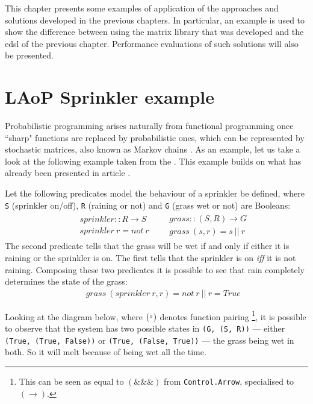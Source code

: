 \documentclass[
  oneside,
  11pt, a4paper,
  footinclude=true,
  headinclude=true,
  cleardoublepage=empty
]{scrbook}
\theoremstyle{definition}
\theoremstyle{definition}
\def\start{&&}
\def\more{\\&&}
\def\kr{\mathbin{\hbox{\tiny${}^\triangledown$}}}
\begin{document}
    This chapter presents some examples of application of the approaches and solutions developed in the previous chapters. In particular, an example is used to show the difference between using the matrix library that was developed and the \gls{edsl} of the previous chapter. Performance evaluations of such solutions will also be presented.
    
        \section{LAoP Sprinkler example}
        
        Probabilistic programming arises naturally from functional programming once ``sharp" functions are replaced by probabilistic ones, which can be represented by stochastic matrices, also known as Markov chains \citep{oliveira2012towards}. As an example, let us take a look at the following example taken from the \citet{wiki:BayesianNetwork}. This example builds on what has already been presented in article \cite{Armando2020}. 
        
        Let the following predicates model the behaviour of a sprinkler be defined, where \texttt{S} (sprinkler on/off), \texttt{R} (raining or not) and \texttt{G} (grass wet or not) are Booleans:
        \begin{eqnarray*}
        \begin{array}{rcl}
        \start sprinkler :: R \to S
        \more sprinkler\ r = not\ r
        \end{array}
        \begin{array}{rcl}
        \start grass :: (S, R) \to G
        \more grass\ (s,r) = s\ ||\ r
        \end{array}
        \end{eqnarray*}
        The second predicate tells that the grass will be wet if and only if either it is raining or the sprinkler is on. The first tells that the sprinkler is on \emph{iff} it is not raining. Composing these two predicates it is possible to see that rain completely determines the state of the grass:
        \begin{eqnarray*}
        \start grass\ (sprinkler\ r,r) = not\ r\ ||\ r = True
        \end{eqnarray*}
        
        Looking at the diagram below, where $(\kr)$ denotes function pairing \footnote{This can be seen as equal to $(\&\&\&)$ from \texttt{Control.Arrow}, specialised to $(\rightarrow)$.}, it is possible to observe that the system has two possible states in \texttt{(G, (S, R))} --- either \texttt{(True, (True, False))} or \texttt{(True, (False, True))} --- the grass being wet in both. So it will melt because of being wet all the time.
        
\end{document}
